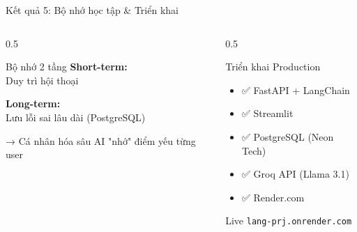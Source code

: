 \documentclass[notheorems,hyperref={bookmarks=true}]{beamer}
\begin{document}

\begin{frame}{Kết quả 5: Bộ nhớ học tập \& Triển khai}
\begin{columns}
    \begin{column}{0.5\textwidth}
        \begin{block}{Bộ nhớ 2 tầng}
            \textbf{Short-term:}\\
            {\footnotesize Duy trì hội thoại}
            
            \vspace{0.2cm}
            
            \textbf{Long-term:}\\
            {\footnotesize Lưu lỗi sai lâu dài (PostgreSQL)}
        \end{block}
        
        \vspace{0.3cm}
        
        \begin{alertblock}{→ Cá nhân hóa sâu}
            AI "nhớ" điểm yếu từng user
        \end{alertblock}
    \end{column}
    \begin{column}{0.5\textwidth}
        \begin{block}{Triển khai Production}
            \begin{itemize}
                \item ✅ FastAPI + LangChain
                \item ✅ Streamlit
                \item ✅ PostgreSQL (Neon Tech)
                \item ✅ Groq API (Llama 3.1)
                \item ✅ Render.com
            \end{itemize}
        \end{block}
        
        \vspace{0.2cm}
        
        \begin{exampleblock}{Live}
            \tiny \texttt{lang-prj.onrender.com}
        \end{exampleblock}
    \end{column}
\end{columns}
\end{frame}
\end{document}
